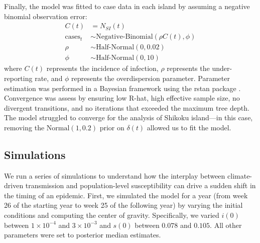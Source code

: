 \documentclass[12pt]{article}
\begin{document}
Finally, the model was fitted to case data in each island by assuming a negative binomial observation error:
\begin{align}
C(t) &= N_{SI}(t)\\
\textrm{cases}_t &\sim \textrm{Negative-Binomial}(\rho C(t), \phi)\\
\rho &\sim \textrm{Half-Normal}(0, 0.02)\\
\phi &\sim \textrm{Half-Normal}(0, 10)
\end{align}
where $C(t)$ represents the incidence of infection, $\rho$ represents the under-reporting rate, and $\phi$ represents the overdispersion parameter.
Parameter estimation was performed in a Bayesian framework using the rstan package \citep{carpenter2017stan}.
Convergence was assess by ensuring low R-hat, high effective sample size, no divergent transitions, and no iterations that exceeded the maximum tree depth.
The model struggled to converge for the analysis of Shikoku island---in this case, removing the $\mathrm{Normal}(1, 0.2)$ prior on $\delta(t)$ allowed us to fit the model.

\subsection*{Simulations}

We run a series of simulations to understand how the interplay between climate-driven transmission and population-level susceptibility can drive a sudden shift in the timing of an epidemic.
First, we simulated the model for a year (from week 26 of the starting year to week 25 of the following year) by varying the initial conditions and computing the center of gravity.
Specifically, we varied $i(0)$ between $1\times 10^{-4}$ and $3\times 10^{-3}$ and $s(0)$ between $0.078$ and $0.105$.
All other parameters were set to posterior median estimates.
\end{document}
